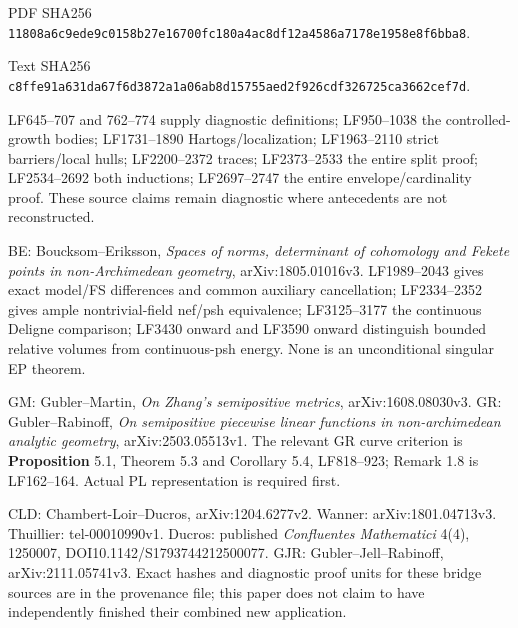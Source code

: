 \documentclass[
  10pt,
]{article}
\begin{document}
PDF SHA256
\texttt{11808a6c9ede9c0158b27e16700fc180a4ac8df12a4586a7178e1958e8f6bba8}.

Text SHA256
\texttt{c8ffe91a631da67f6d3872a1a06ab8d15755aed2f926cdf326725ca3662cef7d}.

LF645--707 and 762--774 supply diagnostic definitions; LF950--1038 the
controlled-growth bodies; LF1731--1890 Hartogs/localization;
LF1963--2110 strict barriers/local hulls; LF2200--2372 traces;
LF2373--2533 the entire split proof; LF2534--2692 both inductions;
LF2697--2747 the entire envelope/cardinality proof. These source claims
remain diagnostic where antecedents are not reconstructed.

BE: Boucksom--Eriksson, \emph{Spaces of norms, determinant of cohomology
and Fekete points in non-Archimedean geometry}, arXiv:1805.01016v3.
LF1989--2043 gives exact model/FS differences and common auxiliary
cancellation; LF2334--2352 gives ample nontrivial-field nef/psh
equivalence; LF3125--3177 the continuous Deligne comparison; LF3430
onward and LF3590 onward distinguish bounded relative volumes from
continuous-psh energy. None is an unconditional singular EP theorem.

GM: Gubler--Martin, \emph{On Zhang's semipositive metrics},
arXiv:1608.08030v3. GR: Gubler--Rabinoff, \emph{On semipositive
piecewise linear functions in non-archimedean analytic geometry},
arXiv:2503.05513v1. The relevant GR curve criterion is
\textbf{Proposition} 5.1, Theorem 5.3 and Corollary 5.4, LF818--923;
Remark 1.8 is LF162--164. Actual PL representation is required first.

CLD: Chambert-Loir--Ducros, arXiv:1204.6277v2. Wanner:
arXiv:1801.04713v3. Thuillier: tel-00010990v1. Ducros: published
\emph{Confluentes Mathematici} 4(4), 1250007,
DOI10.1142/S1793744212500077. GJR: Gubler--Jell--Rabinoff,
arXiv:2111.05741v3. Exact hashes and diagnostic proof units for these
bridge sources are in the provenance file; this paper does not claim to
have independently finished their combined new application.
\end{document}
